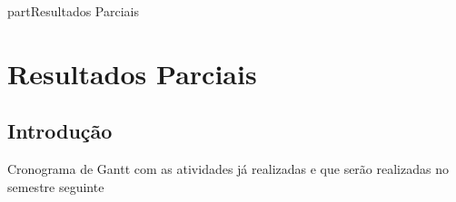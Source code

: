 part{Resultados Parciais}

\chapter[Resultados Parciais]{Resultados Parciais}

\section{Introdução}

Cronograma de Gantt com as atividades já realizadas e que serão realizadas no semestre seguinte
